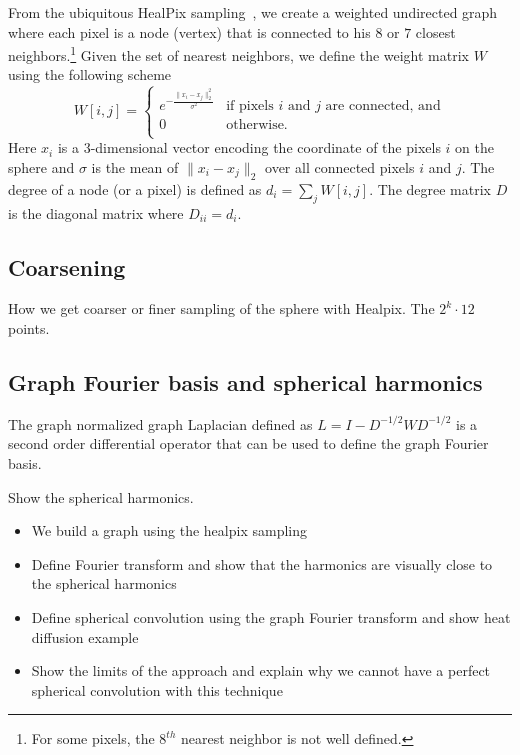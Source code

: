 \documentclass[preprint,12pt,authoryear]{elsarticle}
\newcommand{\assign}[1]{{\color[rgb]{.8,.5,.8}{Assigned: #1 }}}
\begin{document}
From the ubiquitous HealPix sampling~\citep{gorski2005healpix}, we create a weighted undirected graph where each pixel is a node (vertex) that is connected to his $8$ or $7$ closest neighbors.\footnote{For some pixels, the $8^{th}$ nearest neighbor is not well defined.} Given the set of nearest neighbors, we define the weight matrix $W$ using the following scheme
\begin{equation}
W[i,j]=\begin{cases}
e^{-\frac{\|x_i-x_j\|_2^2}{\sigma^2}} & \text{if pixels $i$ and $j$ are connected, and}\\
0 & \text{otherwise.}\\
\end{cases}
\end{equation}
Here $x_i$ is a 3-dimensional vector encoding the coordinate of the pixels $i$ on the sphere and $\sigma$ is the mean of $\|x_i-x_j\|_2$ over all connected pixels $i$ and $j$. The degree of a node (or a pixel) is defined as $d_i = \sum_j W[i,j]$. The degree matrix $D$ is the diagonal matrix where $D_{ii}=d_i$.

\subsection{Coarsening}
\assign{Nathanaël}

How we get coarser or finer sampling of the sphere with Healpix. The $2^k \cdot 12$ points.

\subsection{Graph Fourier basis and spherical harmonics}
\assign{Nathanaël}

The graph normalized graph Laplacian defined as $L = I - D^{-1/2} W D^{-1/2}$ is a second order differential operator that can be used to define the graph Fourier basis. 

Show the spherical harmonics.
 
\begin{itemize}
	\item We build a graph using the healpix sampling
	\item Define Fourier transform and show that the harmonics are visually close to the spherical harmonics
	\item Define spherical convolution using the graph Fourier transform and show heat diffusion example
	\item Show the limits of the approach and explain why we cannot have a perfect spherical convolution with this technique
\end{itemize}
\end{document}

